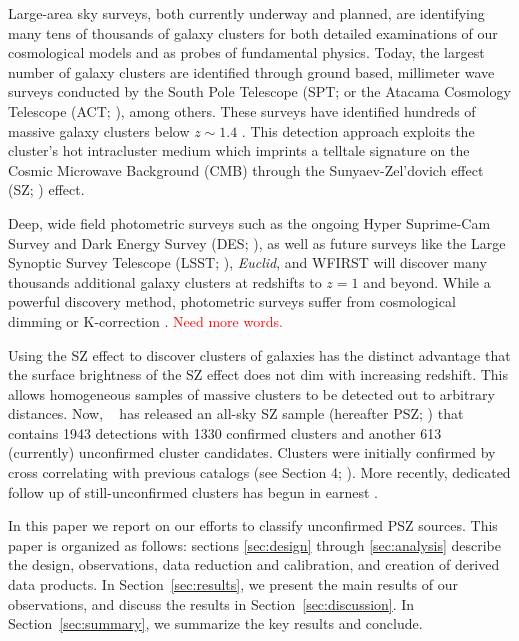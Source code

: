 \documentclass[apj, revtex4-1]{emulateapj}
\newcommand{\editorial}[1]{\textcolor{red}{#1}}
\begin{document}
Large-area sky surveys, both currently underway and planned, are identifying many tens of thousands of galaxy clusters for both detailed examinations of our cosmological models and as probes of fundamental physics. Today, the largest number of galaxy clusters are identified through ground based, millimeter wave surveys conducted by the South Pole Telescope (SPT; \citealt{Carlstrom2011} or the Atacama Cosmology Telescope (ACT; \citealt{Swetz2011}), among others. These surveys have identified hundreds of massive galaxy clusters below $z \sim 1.4$ . This detection approach exploits the cluster's hot intracluster medium which imprints a telltale signature on the Cosmic Microwave Background (CMB) through the Sunyaev-Zel'dovich effect (SZ; \citealt{Sunyaev1972}) effect.

Deep, wide field photometric surveys such as the ongoing Hyper Suprime-Cam Survey \citep{Aihara2018a} and Dark Energy Survey (DES; \citealt{DES2005}), as well as future surveys like the Large Synoptic Survey Telescope (LSST; \citealt{LSST2012}), \textit{Euclid}, and WFIRST will discover many thousands additional galaxy clusters at redshifts to $z=1$  and beyond. While a powerful discovery method, photometric surveys suffer from cosmological dimming or K-correction \citep{Hogg2002}. \editorial{Need more words.}

Using the SZ effect to discover clusters of galaxies has the distinct advantage that the surface brightness of the SZ effect does not dim with increasing redshift. This allows homogeneous samples of massive clusters to be detected out to arbitrary distances. Now, \planck\ \citep{Tauber2010, PlanckCollaboration2011} has released an all-sky SZ sample (hereafter PSZ; \citealt{PlanckCollaboration2014, PlanckCollaboration2015a}) that contains 1943 detections with 1330 confirmed clusters and another 613 (currently) unconfirmed cluster candidates. Clusters were initially confirmed by cross correlating with previous catalogs (see Section 4; \citealt{PlanckCollaboration2014}). More recently, dedicated follow up of still-unconfirmed clusters has begun in earnest .

In this paper we report on our efforts to classify unconfirmed PSZ sources. This paper is organized as follows: sections \ref{sec:design} through \ref{sec:analysis} describe the design, observations, data reduction and calibration, and creation of derived data products. In Section~\ref{sec:results}, we present the main results of our observations, and discuss the results in Section~\ref{sec:discussion}. In Section~\ref{sec:summary}, we summarize the key results and conclude.
\end{document}
